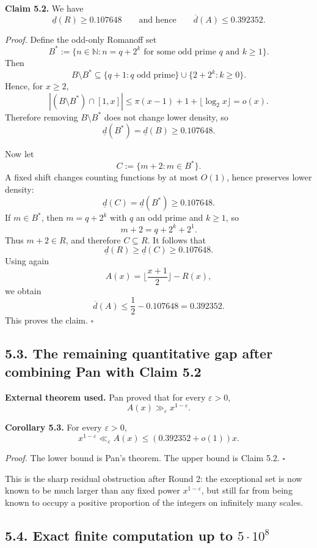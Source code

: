 \medskip
\noindent\textbf{Claim 5.2.}
We have
\[
\underline d(R)\ge 0.107648
\qquad\text{and hence}\qquad
\overline d(A)\le 0.392352.
\]

\noindent\emph{Proof.}
Define the odd-only Romanoff set
\[
B^{\ast}:=\{n\in\mathbb N: n=q+2^k\text{ for some odd prime }q\text{ and }k\ge 1\}.
\]
Then
\[
B\setminus B^{\ast}\subseteq \{q+1:q\text{ odd prime}\}\cup\{2+2^k:k\ge 0\}.
\]
Hence, for $x\ge 2$,
\[
|(B\setminus B^{\ast})\cap[1,x]|
\le \pi(x-1)+1+\lfloor\log_2 x\rfloor
= o(x).
\]
Therefore removing $B\setminus B^{\ast}$ does not change lower density, so
\[
\underline d(B^{\ast})=\underline d(B)\ge 0.107648.
\]

Now let
\[
C:=\{m+2:m\in B^{\ast}\}.
\]
A fixed shift changes counting functions by at most $O(1)$, hence preserves lower density:
\[
\underline d(C)=\underline d(B^{\ast})\ge 0.107648.
\]
If $m\in B^{\ast}$, then $m=q+2^k$ with $q$ an odd prime and $k\ge 1$, so
\[
m+2=q+2^k+2^1.
\]
Thus $m+2\in R$, and therefore $C\subseteq R$. It follows that
\[
\underline d(R)\ge \underline d(C)\ge 0.107648.
\]
Using again
\[
A(x)=\Big\lfloor\frac{x+1}{2}\Big\rfloor-R(x),
\]
we obtain
\[
\overline d(A)\le \frac12-0.107648=0.392352.
\]
This proves the claim. \hfill$\square$

\subsection*{5.3. The remaining quantitative gap after combining Pan with Claim 5.2}

\noindent\textbf{External theorem used.}
Pan proved that for every $\varepsilon>0$,
\[
A(x)\gg_{\varepsilon} x^{1-\varepsilon}.
\]

\medskip
\noindent\textbf{Corollary 5.3.}
For every $\varepsilon>0$,
\[
x^{1-\varepsilon}\ll_{\varepsilon} A(x)\le (0.392352+o(1))x.
\]

\noindent\emph{Proof.}
The lower bound is Pan's theorem. The upper bound is Claim 5.2. \hfill$\square$

\medskip
\noindent This is the sharp residual obstruction after Round 2: the exceptional set is now known to be much larger than any fixed power $x^{1-\varepsilon}$, but still far from being known to occupy a positive proportion of the integers on infinitely many scales.

\subsection*{5.4. Exact finite computation up to $5\cdot 10^8$}

